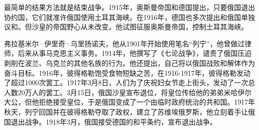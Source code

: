 \documentclass{article}
\begin{document}
最简单的结果方法就是结束战争。1915年，奥斯曼帝国和德国提出，只要俄国退出协约国，它们就准许俄国使用土耳其海峡。在1916年，德国也多次提出和俄国单独议和。但沙皇的帝国野心从未改变。他试图征服奥斯曼帝国，控制土耳其海峡。

弗拉基米尔·伊里奇·乌里扬诺夫，他从1901年开始使用笔名“列宁”，他曾做过律师，后来从事马克思主义事务。1914年，他撰写了《七论战争》，谴责了俄国压迫剥削在波兰、乌克兰的其他名族的行为。他还提出，自己将以俄国战败和解体作为奋斗目标。1916年，彼得格勒饱受食物短缺之苦，在1916-1917年，彼得格勒发动了超过1000次罢工。1917年3月8日，人们为了庆祝妇女节走上街头，发动了一次总人数20万人的罢工。3月15日，俄国沙皇宣布退位，将皇位传给他的弟弟米哈伊尔大公，但他拒绝接受皇位，于是俄国变成了一个由临时政府统治的共和国。1917年秋天，列宁回国并在彼得格勒夺取了政权，建立了苏维埃俄罗斯，他立刻着手让俄国退出战争。1918年3月，俄国接受德国的和平条约，宣布退出战争。
\end{document}
